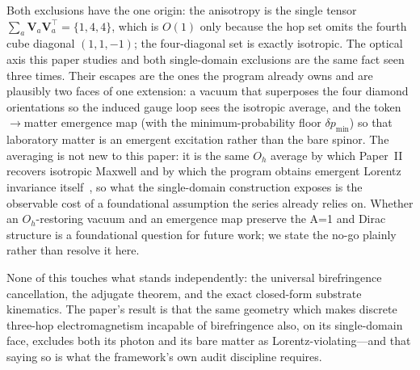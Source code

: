 Both exclusions have the one origin: the anisotropy is the single tensor
$\sum_a\mathbf{V}_a\mathbf{V}_a^{\!\top} = \{1,4,4\}$, which is $O(1)$ only because the hop
set omits the fourth cube diagonal $(1,1,-1)$; the four-diagonal set is exactly isotropic.
The optical axis this paper studies and both single-domain exclusions are the same fact
seen three times. Their escapes are the ones the program already owns and are plausibly
two faces of one extension: a vacuum that superposes the four diamond orientations so the
induced gauge loop sees the isotropic average, and the token$\to$matter emergence map
(with the minimum-probability floor $\delta p_\text{min}$) so that laboratory matter is an
emergent excitation rather than the bare spinor. The averaging is not new to this paper:
it is the same $O_h$ average by which Paper~II~\cite{menendez2026smderivation} recovers
isotropic Maxwell and by which the program obtains emergent Lorentz invariance
itself~\cite{menendez2026geometryfirst}, so what the single-domain construction exposes is
the observable cost of a foundational assumption the series already relies on. Whether an
$O_h$-restoring vacuum and an emergence map preserve the A=1 and Dirac structure is a
foundational question for future work; we state the no-go plainly rather than resolve it
here.

None of this touches what stands independently: the universal birefringence cancellation,
the adjugate theorem, and the exact closed-form substrate kinematics. The paper's result
is that the same geometry which makes discrete three-hop electromagnetism incapable of
birefringence also, on its single-domain face, excludes both its photon and its bare
matter as Lorentz-violating---and that saying so is what the framework's own audit
discipline requires.
